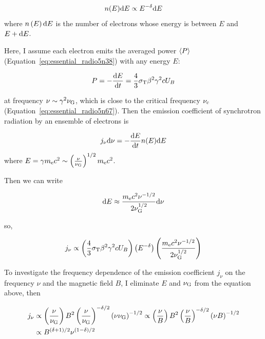 \begin{equation}\label{eq:essential_radio5n70}
    n(E) \mathrm{d} E \propto E^{-\delta} \mathrm{d} E
\end{equation}
where $n\left(E\right)\mathrm{d} E$ is the number of electrons whose energy is between $E$ and $E+\mathrm{d} E$.

Here, I assume each electron emits the averaged power $\left\langle P\right\rangle$ (Equation~\ref{eq:essential_radio5n38}) with any energy $E$:

\begin{equation}\label{eq:essential_radio5n71}
    P=-\frac{\mathrm{d} E}{\mathrm{d} t}=\frac{4}{3} \sigma_{\mathrm{T}} \beta^2 \gamma^2 c U_B
\end{equation}

at frequency $\nu \sim \gamma^2\nu_{\mathrm{G}}$, which is close to the critical frequency $\nu_{\mathrm{c}}$ (Equation~\ref{eq:essential_radio5n67}).
Then the emission coefficient of synchrotron radiation by an ensemble of electrons is

\begin{equation}\label{eq:essential_radio5n73}
    j_{\nu} \mathrm{d} \nu=-\frac{\mathrm{d} E}{\mathrm{d} t} n(E) \mathrm{d} E
\end{equation}
where $E = \gamma m_{\mathrm{e}} c^2 \sim \left(\frac{\nu}{\nu_{\mathrm{G}}}\right)^{1/2} m_{\mathrm{e}}c^2$.

Then we can write

\begin{equation}\label{eq:essential_radio5n75}
    \mathrm{d} E \approx \frac{m_{\mathrm{e}} c^2 \nu^{-1 / 2}}{2 \nu_{\mathrm{G}}^{1 / 2}} \mathrm{d} \nu
\end{equation}

so,

\begin{equation}\label{eq:essential_radio5n76}
    j_{\nu} \propto\left(\frac{4}{3} \sigma_{\mathrm{T}} \beta^2 \gamma^2 c U_B\right)\left(E^{-\delta}\right)\left(\frac{m_{\mathrm{e}} c^2 \nu^{-1 / 2}}{2 \nu_{\mathrm{G}}^{1 / 2}}\right)
\end{equation}

To investigate the frequency dependence of the emission coefficient $j_{\nu}$ on the frequency $\nu$ and the magnetic field $B$, I eliminate  $E$ and $\nu_{\mathrm{G}}$ from the equation above, then

\begin{equation}\label{eq:essential_radio5n77}
    \begin{aligned}
        j_{\nu} & \propto \left(\frac{\nu}{\nu_{\mathrm{G}}}\right) B^2 \left(\frac{\nu}{\nu_{\mathrm{G}}}\right)^{-\delta / 2} \left(\nu \nu_{\mathrm{G}}\right)^{-1 / 2} \propto \left(\frac{\nu}{B}\right) B^2 \left(\frac{\nu}{B}\right)^{-\delta / 2} \left(\nu B\right)^{-1 / 2}\\
                & \propto B^{(\delta+1) / 2} \nu^{(1-\delta) / 2}
    \end{aligned}
\end{equation}

